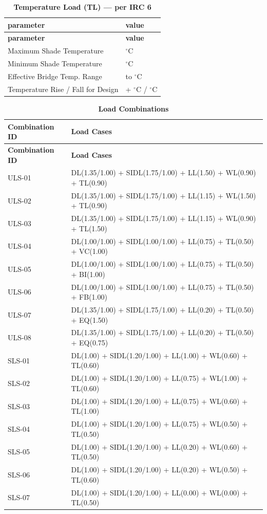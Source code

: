 \documentclass[12pt,a4paper]{report}
\numberwithin{table}{chapter}
\numberwithin{figure}{chapter}
\begin{document}
\vspace{1em}
\begin{longtable}{|L{5.5cm}|p{10.0cm}|}
\caption{\textbf{Temperature Load (TL) --- per IRC 6}}
\hline
\textbf{parameter} & \textbf{value} \\
\hline
\endfirsthead
\textbf{parameter} & \textbf{value} \\
\hline
\endhead
\textnormal{Maximum Shade Temperature} &  $^\circ$C \\[6pt]
\hline
\textnormal{Minimum Shade Temperature} &  $^\circ$C \\[6pt]
\hline
\textnormal{Effective Bridge Temp. Range} &  to  $^\circ$C \\[6pt]
\hline
\textnormal{Temperature Rise / Fall for Design} & + $^\circ$C / \textminus{} $^\circ$C \\[6pt]
\hline
\end{longtable}

\vspace{1em}
\begin{longtable}{|C{4.0cm}|p{11.5cm}|}
\caption{\textbf{Load Combinations}}
\hline
\textbf{Combination ID} & \textbf{Load Cases} \\[6pt]
\hline
\endfirsthead
\textbf{Combination ID} & \textbf{Load Cases} \\[6pt]
\hline
\endhead
ULS-01 & DL(1.35/1.00) + SIDL(1.75/1.00) + LL(1.50) + WL(0.90) + TL(0.90) \\[6pt]
\hline
ULS-02 & DL(1.35/1.00) + SIDL(1.75/1.00) + LL(1.15) + WL(1.50) + TL(0.90) \\[6pt]
\hline
ULS-03 & DL(1.35/1.00) + SIDL(1.75/1.00) + LL(1.15) + WL(0.90) + TL(1.50) \\[6pt]
\hline
ULS-04 & DL(1.00/1.00) + SIDL(1.00/1.00) + LL(0.75) + TL(0.50) + VC(1.00) \\[6pt]
\hline
ULS-05 & DL(1.00/1.00) + SIDL(1.00/1.00) + LL(0.75) + TL(0.50) + BI(1.00) \\[6pt]
\hline
ULS-06 & DL(1.00/1.00) + SIDL(1.00/1.00) + LL(0.75) + TL(0.50) + FB(1.00) \\[6pt]
\hline
ULS-07 & DL(1.35/1.00) + SIDL(1.75/1.00) + LL(0.20) + TL(0.50) + EQ(1.50) \\[6pt]
\hline
ULS-08 & DL(1.35/1.00) + SIDL(1.75/1.00) + LL(0.20) + TL(0.50) + EQ(0.75) \\[6pt]
\hline
SLS-01 & DL(1.00) + SIDL(1.20/1.00) + LL(1.00) + WL(0.60) + TL(0.60) \\[6pt]
\hline
SLS-02 & DL(1.00) + SIDL(1.20/1.00) + LL(0.75) + WL(1.00) + TL(0.60) \\[6pt]
\hline
SLS-03 & DL(1.00) + SIDL(1.20/1.00) + LL(0.75) + WL(0.60) + TL(1.00) \\[6pt]
\hline
SLS-04 & DL(1.00) + SIDL(1.20/1.00) + LL(0.75) + WL(0.50) + TL(0.50) \\[6pt]
\hline
SLS-05 & DL(1.00) + SIDL(1.20/1.00) + LL(0.20) + WL(0.60) + TL(0.50) \\[6pt]
\hline
SLS-06 & DL(1.00) + SIDL(1.20/1.00) + LL(0.20) + WL(0.50) + TL(0.60) \\[6pt]
\hline
SLS-07 & DL(1.00) + SIDL(1.20/1.00) + LL(0.00) + WL(0.00) + TL(0.50) \\[6pt]
\hline
\end{longtable}
\end{document}

